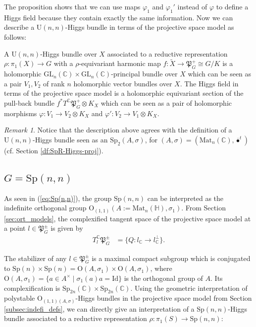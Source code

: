 \documentclass[oneside,11pt]{amsart}
\theoremstyle{definition}
\theoremstyle{remark}
\newtheorem{rem}[thm]{Remark}
\numberwithin{thm}{section}
\numberwithin{equation}{section}
\begin{document}
The proposition shows that we can use maps $\varphi_1$ and $\varphi_1'$ instead of $\varphi$ to define a Higgs field because they contain exactly the same information. Now we can describe a $\mathrm U(n,n)$-Higgs bundle in terms of the projective space model as follows:

    A $\mathrm{U}(n,n)$-Higgs bundle over $X$ associated to a reductive representation $\rho\colon \pi_1(X)\to G$ with a $\rho$-equivariant harmonic map $f\colon\tilde X\to \mathfrak P_G^+\cong G/K$ is a holomorphic $\mathrm{GL}_n(\mathbb C)\times\mathrm{GL}_n(\mathbb C)$-principal bundle over $X$ which can be seen as a pair $V_1,V_2$ of rank $n$ holomorphic vector bundles over $X$. The Higgs field in terms of the projective space model is a holomorphic equivariant section of the pull-back bundle $f^*T^\mathbb C\mathfrak P_G^+\otimes K_X$ which can be seen as a pair of holomorphic morphisms 
    $\varphi\colon V_1\to V_2\otimes K_X$ and $\varphi'\colon V_2\to V_1\otimes K_X$. 


\begin{rem}
    Notice that the description above agrees with the definition of a $\mathrm{U}(n,n)$-Higgs bundle seen as an $\mathrm{Sp}_2(A,\sigma)$, for $(A,\sigma)=(\mathrm{Mat}_n(\mathbb C),\overline\bullet^t)$ (cf. Section \ref{df:SpR-Higgs-proj}).
\end{rem}

\subsection{\texorpdfstring{$G=\mathrm{Sp}(n,n)$}{G=Sp(n,n)}}

As seen in (\ref{eq:Sp(n,n)}), the group $\mathrm{Sp}(n,n)$ can be interpreted as the indefinite orthogonal group $\mathrm{O}_{(1,1)}(A:=\mathrm{Mat}_n(\mathbb{H}),\sigma_1)$. From Section \ref{sec:ort_models}, the complexified tangent space of the projective space model at a point $l\in\mathfrak{P}_G^\pm$ is given by
\begin{align*}
    T_l^\mathbb{C}\mathfrak{P}_G^\pm&=\{Q\colon l_\mathbb C\to l_\mathbb C^\perp\}.
\end{align*}

The stabilizer of any $l\in \mathfrak{P}_G^\pm$  is a maximal compact subgroup which is conjugated to  $\mathrm{Sp}(n)\times\mathrm{Sp}(n)=\mathrm{O}(A,\sigma_1)\times\mathrm{O}(A,\sigma_1)$, where $\mathrm{O}(A,\sigma_1)=\{ a\in A^\times\mid \sigma_1(a)a=\mathrm{Id}\}$ is the orthogonal group of $A$. Its complexification is $\mathrm{Sp}_{2n}(\mathbb C)\times\mathrm{Sp}_{2n}(\mathbb C)$. Using the geometric interpretation of polystable $\mathrm{O}_{(1,1)(A, \sigma)}$-Higgs bundles in the projective space model from Section \ref{subsec:indefi_defs}, we can directly give an interpretation of a $\mathrm{Sp}(n,n)$-Higgs bundle associated to a reductive representation $\rho\colon\pi_1(S)\to\mathrm{Sp}(n,n)$:
\end{document}
